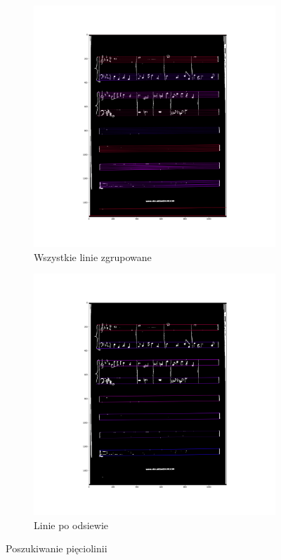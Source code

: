 \documentclass[12pt]{article}
\begin{document}
	\begin{figure}[h!]
		\centering
		\begin{subfigure}[b]{0.48\linewidth}
			\includegraphics[width=\linewidth]{zdj/5l0.png}
			\caption{Wszystkie linie zgrupowane}
		\end{subfigure}
		\begin{subfigure}[b]{0.48\linewidth}
			\includegraphics[width=\linewidth]{zdj/5l1.png}
			\caption{Linie po odsiewie}
		\end{subfigure}
		\caption{Poszukiwanie pięciolinii}
		\label{fig:5l}
	\end{figure}
\end{document}
